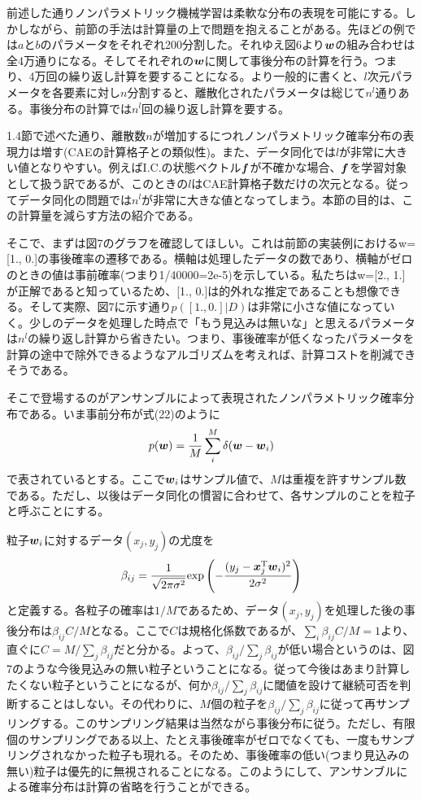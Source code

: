 \documentclass[dvipdfmx, 9pt, a4paper]{jsarticle}
\newcommand{\bm}[1]{{\mbox{\boldmath $#1$}}}
\begin{document}
前述した通りノンパラメトリック機械学習は柔軟な分布の表現を可能にする。しかしながら、前節の手法は計算量の上で問題を抱えることがある。先ほどの例では$a$と$b$のパラメータをそれぞれ200分割した。それゆえ図6より$\bm w$の組み合わせは全4万通りになる。そしてそれぞれの$\bm w$に関して事後分布の計算を行う。つまり、4万回の繰り返し計算を要することになる。より一般的に書くと、$l$次元パラメータを各要素に対し$n$分割すると、離散化されたパラメータは総じて$n^l$通りある。事後分布の計算では$n^l$回の繰り返し計算を要する。\par
1.4節で述べた通り、離散数$n$が増加するにつれノンパラメトリック確率分布の表現力は増す(CAEの計算格子との類似性)。また、データ同化では$l$が非常に大きい値となりやすい。例えばI.C.の状態ベクトル$\bm f$が不確かな場合、$\bm f$を学習対象として扱う訳であるが、このときの$l$はCAE計算格子数だけの次元となる。従ってデータ同化の問題では$n^l$が非常に大きな値となってしまう。本節の目的は、この計算量を減らす方法の紹介である。\par
そこで、まずは図7のグラフを確認してほしい。これは前節の実装例におけるw=[1., 0.]の事後確率の遷移である。横軸は処理したデータの数であり、横軸がゼロのときの値は事前確率(つまり1/40000=2e-5)を示している。私たちはw=[2., 1.]が正解であると知っているため、[1., 0.]は的外れな推定であることも想像できる。そして実際、図7に示す通り$p([1., 0.]|D)$は非常に小さな値になっていく。少しのデータを処理した時点で「もう見込みは無いな」と思えるパラメータは$n^l$の繰り返し計算から省きたい。つまり、事後確率が低くなったパラメータを計算の途中で除外できるようなアルゴリズムを考えれば、計算コストを削減できそうである。\par
そこで登場するのがアンサンブルによって表現されたノンパラメトリック確率分布である。いま事前分布が式(22)のように
\begin{equation}
p(\bm w)=\frac{1}{M}\sum_i^M \delta(\bm w - \bm w_i) \notag
\end{equation}
で表されているとする。ここで$\bm w_i$はサンプル値で、$M$は重複を許すサンプル数である。ただし、以後はデータ同化の慣習に合わせて、各サンプルのことを粒子と呼ぶことにする。\par
粒子$\bm w_i$に対するデータ$(x_j, y_j)$の尤度を
\begin{equation}
\beta_{ij}=\frac{1}{\sqrt{2\pi\sigma^2}}{\rm exp}\left(-\frac{(y_j-\bm x_j^{\rm T}\bm w_i)^2}{2\sigma^2}\right) \notag
\end{equation}
と定義する。各粒子の確率は$1/M$であるため、データ$(x_j, y_j)$を処理した後の事後分布は$\beta_{ij}C/M$となる。ここで$C$は規格化係数であるが、$\sum_i \beta_{ij}C/M=1$より、直ぐに$C=M/\sum_j \beta_{ij}$だと分かる。よって、$\beta_{ij}/\sum_j \beta_{ij}$が低い場合というのは、図7のような今後見込みの無い粒子ということになる。従って今後はあまり計算したくない粒子ということになるが、何か$\beta_{ij}/\sum_j \beta_{ij}$に閾値を設けて継続可否を判断することはしない。その代わりに、$M$個の粒子を$\beta_{ij}/\sum_j \beta_{ij}$に従って再サンプリングする。このサンプリング結果は当然ながら事後分布に従う。ただし、有限個のサンプリングである以上、たとえ事後確率がゼロでなくても、一度もサンプリングされなかった粒子も現れる。そのため、事後確率の低い(つまり見込みの無い)粒子は優先的に無視されることになる。このようにして、アンサンブルによる確率分布は計算の省略を行うことができる。\par
\end{document}
